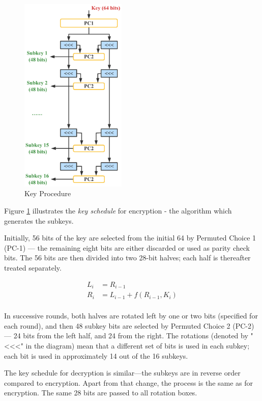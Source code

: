 \documentclass[11pt]{article}
\begin{document}
\begin{figure}[h!]
\centering
\includegraphics[width=0.45\textwidth,height=0.7\textwidth]{key_schedule}
\caption{Key Procedure}
\label{fig:key_schedule}
\end{figure}

Figure \ref{fig:key_schedule} illustrates the \textit{key schedule} for encryption - the algorithm which generates the subkeys.

Initially, 56 bits of the key are selected from the initial 64 by Permuted Choice 1 (PC-1) — the remaining eight bits are either discarded or used as parity check bits. The 56 bits are then divided into two 28-bit halves; each half is thereafter treated separately.

$$
\begin{aligned}
L_i &= R_{i - 1} \\ 
R_i &= L_{i - 1} + f(R_{i - 1}, K_{i}) \\
\end{aligned}
$$

In successive rounds, both halves are rotated left by one or two bits (specified for each round), and then 48 subkey bits are selected by Permuted Choice 2 (PC-2) — 24 bits from the left half, and 24 from the right. The rotations (denoted by "<<<" in the diagram) mean that a different set of bits is used in each subkey; each bit is used in approximately 14 out of the 16 subkeys.

The key schedule for decryption is similar—the subkeys are in reverse order compared to encryption. Apart from that change, the process is the same as for encryption. The same 28 bits are passed to all rotation boxes.
\end{document}
